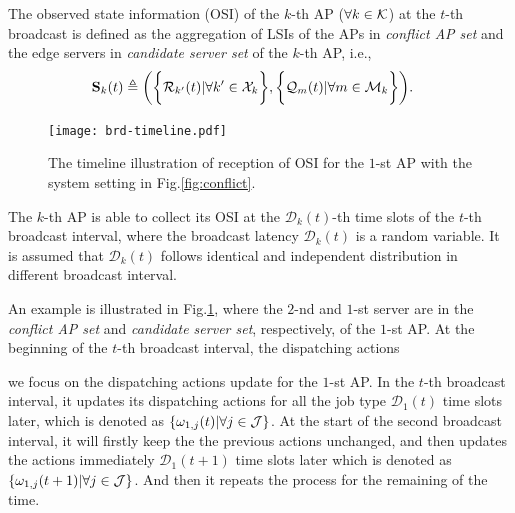 \begin{definition}
    The observed state information (OSI) of the $k$-th AP ($\forall k\in\mathcal{K}$) at the $t$-th broadcast is defined as the aggregation of LSIs of the APs in \emph{conflict AP set} and the edge servers in \emph{candidate server set} of the $k$-th AP, i.e.,
    \begin{align}
        \mathbf{S}_{k}(t) &\triangleq
        \bigg(
            \bigg\{\mathcal{R}_{k'}(t) | \forall k'\in\mathcal{X}_{k}\bigg\},
            \bigg\{\mathcal{Q}_{m}(t) | \forall m\in\mathcal{M}_{k}\bigg\}
        \bigg).
    \end{align}
    \label{def:OSI}
\end{definition}

\begin{figure}[t]
    \centering
    \texttt{[image: brd-timeline.pdf]}
    \caption{The timeline illustration of reception of OSI for the $1$-st AP with the system setting in Fig.\ref{fig:conflict}.}
    \label{fig:brd-timeline}
\end{figure}

The $k$-th AP is able to collect its OSI at the $\mathcal{D}_{k}(t)$-th time slots of the $t$-th broadcast interval, where the broadcast latency $\mathcal{D}_{k}(t)$ is a random variable.
It is assumed that $\mathcal{D}_{k}(t)$ follows identical and independent distribution in different broadcast interval.

\begin{example}
    An example is illustrated in Fig.\ref{fig:brd-timeline}, where the $2$-nd and $1$-st server are in the \emph{conflict AP set} and \emph{candidate server set}, respectively, of the $1$-st AP.
    At the beginning of the $t$-th broadcast interval, the dispatching actions 

    we focus on the dispatching actions update for the $1$-st AP.
    In the $t$-th broadcast interval, it updates its dispatching actions for all the job type $\mathcal{D}_{1}(t)$ time slots later, which is denoted as $\{\omega_{1,j}(t) | \forall j\in\mathcal{J}\}$.
    At the start of the second broadcast interval, it will firstly keep the the previous actions unchanged, and then updates the actions immediately $\mathcal{D}_{1}(t+1)$ time slots later which is denoted as $\{\omega_{1,j}(t+1) | \forall j\in\mathcal{J}\}$.
    And then it repeats the process for the remaining of the time.
\end{example}
